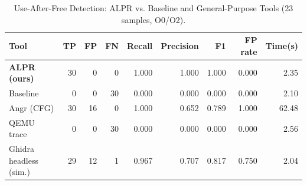 \begin{table}[t]
\centering
\caption{Use-After-Free Detection: ALPR vs. Baseline and General-Purpose Tools (23 samples, O0/O2).}
\label{tab:uaf-alpr-comparison}
\small
\begin{tabular}{lrrrrrrrr}
\hline
Tool & TP & FP & FN & Recall & Precision & F1 & FP rate & Time(s) \\
\hline
  \textbf{ALPR (ours)} & 30 & 0 & 0 & 1.000 & 1.000 & 1.000 & 0.000 & 2.35 \\
  Baseline & 0 & 0 & 30 & 0.000 & 0.000 & 0.000 & 0.000 & 2.10 \\
  Angr (CFG) & 30 & 16 & 0 & 1.000 & 0.652 & 0.789 & 1.000 & 62.48 \\
  QEMU trace & 0 & 0 & 30 & 0.000 & 0.000 & 0.000 & 0.000 & 2.56 \\
  Ghidra headless (sim.) & 29 & 12 & 1 & 0.967 & 0.707 & 0.817 & 0.750 & 2.04 \\
\hline
\end{tabular}
\end{table}